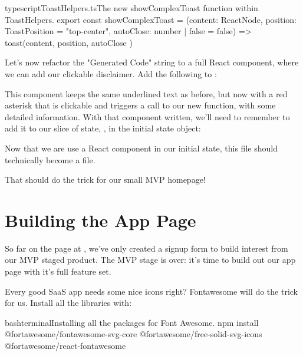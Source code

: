\documentclass[a4paper,headinclude=on,footinclude=on,12pt,oneside]{scrbook}
\begin{document}
\begin{codeInput}{typescript}{ToastHelpers.ts}{The new showComplexToast function within ToastHelpers.}
export const showComplexToast = (content: ReactNode, position: ToastPosition = "top-center", autoClose: number | false = false) => {
    toast(content, { position, autoClose })
}
\end{codeInput}


Let's now refactor the "Generated Code" string to a full React component, where we can add our clickable disclaimer. Add the following to :


This component keeps the same underlined text as before, but now with a red asterisk that is clickable and triggers a call to our new  function, with some detailed information. With that component written, we'll need to remember to add it to our slice of state, , in the initial state object:

\begin{codeInput}{jsx}{editorsSlice.tsx}{The new showComplexToast function within ToastHelpers.}
...
[EditorID.TRY_IT_RESULTS]: {
  editorTitle: <GeneratedCodeTitleWithWarning />,
...
\end{codeInput}

Now that we are use a React component in our initial state, this file should technically become a  file.

That should do the trick for our small MVP homepage!

\section{Building the App Page}

So far on the page at , we've only created a signup form to build interest from our MVP staged product. The MVP stage is over: it's time to build out our app page with it's full feature set.


Every good SaaS app needs some nice icons right? Fontawesome will do the trick for us. Install all the libraries with:

\begin{codeInput}{bash}{terminal}{Installing all the packages for Font Awesome.}
npm install @fortawesome/fontawesome-svg-core @fortawesome/free-solid-svg-icons @fortawesome/react-fontawesome
\end{codeInput}
\end{document}
